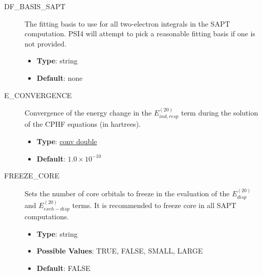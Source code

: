\documentclass[letterpaper,10pt,english]{sphinxmanual}
\begin{document}
\begin{description}
\item[{DF\_BASIS\_SAPT}] \leavevmode{}\label{index:term-27}
The fitting basis to use for all two-electron integrals
in the SAPT computation. PSI4 will attempt to pick
a reasonable fitting basis if one is not provided.
\begin{itemize}
\item {} 
\textbf{Type}: string

\item {} 
\textbf{Default}: none

\end{itemize}

\end{description}
\begin{description}
\item[{E\_CONVERGENCE}] \leavevmode{}\label{index:term-28}
Convergence of the energy change in the $E_{ind,resp}^{(20)}$
term during the solution of the CPHF equations (in hartrees).
\begin{itemize}
\item {} 
\textbf{Type}: {\hyperref[index:conv-double]{conv double}}

\item {} 
\textbf{Default}: $1.0 \times 10^{-10}$

\end{itemize}

\end{description}
\begin{description}
\item[{FREEZE\_CORE}] \leavevmode{}\label{index:term-29}
Sets the number of core orbitals to freeze in the evaluation
of the $E_{disp}^{(20)}$ and $E_{exch-disp}^{(20)}$
terms. It is recommended to freeze core in all SAPT computations.
\begin{itemize}
\item {} 
\textbf{Type}: string

\item {} 
\textbf{Possible Values}: TRUE, FALSE, SMALL, LARGE

\item {} 
\textbf{Default}: FALSE

\end{itemize}

\end{description}
\end{document}
